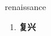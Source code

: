 
\begin{frame}
{\huge renaissance}
\begin{center}
\begin{enumerate}\Large
  \item \textbf{复兴}
\end{enumerate}
\end{center}
\end{frame}
